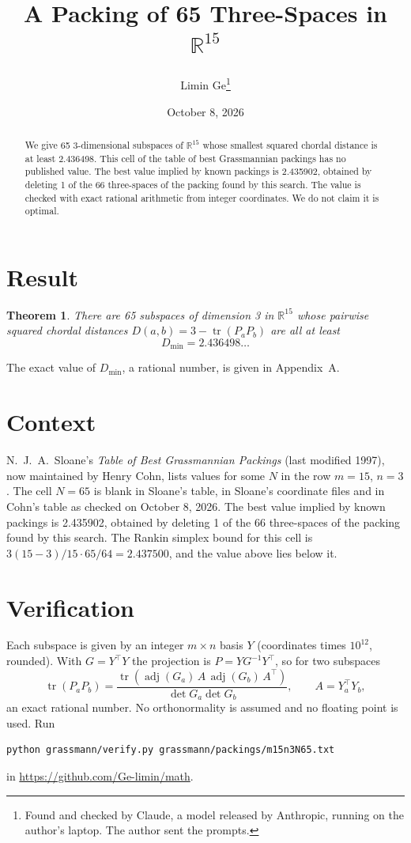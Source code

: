 \documentclass[11pt,a4paper]{article}
\title{A Packing of 65 Three-Spaces in $\mathbb{R}^{15}$}
\author{Limin Ge\thanks{Found and checked by Claude, a model released by Anthropic, running on the author's laptop. The author sent the prompts.}}
\date{October 8, 2026}
\newtheorem*{theorem}{Theorem}
\begin{document}
\maketitle
\begin{abstract}
We give 65 3-dimensional subspaces of $\mathbb{R}^{15}$ whose smallest squared chordal distance is at least 2.436498. This cell of the table of best Grassmannian packings has no published value. The best value implied by known packings is 2.435902, obtained by deleting 1 of the 66 three-spaces of the packing found by this search. The value is checked with exact rational arithmetic from integer coordinates. We do not claim it is optimal.
\end{abstract}

\section{Result}
\begin{theorem}
There are 65 subspaces of dimension 3 in $\mathbb{R}^{15}$ whose pairwise squared chordal distances $D(a,b) = 3 - \operatorname{tr}(P_aP_b)$ are all at least
\[ D_{\min} = 2.436498\ldots \]
\end{theorem}
The exact value of $D_{\min}$, a rational number, is given in Appendix~A.


\section{Context}
N.~J.~A.~Sloane's \emph{Table of Best Grassmannian Packings} (last modified 1997), now maintained by Henry Cohn, lists values for some $N$ in the row $m=15$, $n=3$. The cell $N=65$ is blank in Sloane's table, in Sloane's coordinate files and in Cohn's table as checked on October 8, 2026. The best value implied by known packings is 2.435902, obtained by deleting 1 of the 66 three-spaces of the packing found by this search. The Rankin simplex bound for this cell is $3(15-3)/15\cdot 65/64 = 2.437500$, and the value above lies below it.


\section{Verification}
Each subspace is given by an integer $m\times n$ basis $Y$ (coordinates times $10^{12}$, rounded). With $G=Y^\top Y$ the projection is $P=YG^{-1}Y^\top$, so for two subspaces
\[ \operatorname{tr}(P_aP_b)=\frac{\operatorname{tr}(\operatorname{adj}(G_a)\,A\,\operatorname{adj}(G_b)\,A^\top)}{\det G_a\det G_b},\qquad A=Y_a^\top Y_b, \]
an exact rational number. No orthonormality is assumed and no floating point is used. Run
\begin{verbatim}
python grassmann/verify.py grassmann/packings/m15n3N65.txt
\end{verbatim}
in \url{https://github.com/Ge-limin/math}.
\end{document}
